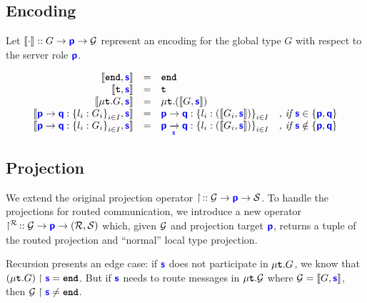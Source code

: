 \documentclass{article}
\begin{document}
\subsection{Encoding}
Let $\encode{\cdot} :: G \to \role{p} \to \newglobal$ represent an encoding for the global
type $G$ with respect to the server role $\role{p}$.

\doublespacing
\[
\begin{array}{rcll}
		\tyencode{\tyend}{s} & = & \tyend & \\
		\tyencode{\tyrecvar}{s} & = & \tyrecvar & \\
		\tyencode{\tyrec{G}}{s} & = & \tyrec{\left(\tyencode{G}{s}\right)} & \\
		\tyencode{\gcomm{p}{q}{l_i: G_i}{i \in I}}{s} & = & \gcomm{p}{q}{l_i: \left(\tyencode{G_i}{s}\right)}{i \in I} & \textit{, if $\role{s} \in \left\{\role{p}, \role{q}\right\}$} \\
		\tyencode{\gcomm{p}{q}{l_i: G_i}{i \in I}}{s} & = & \gcommroute{p}{q}{s}{l_i: \left(\tyencode{G_i}{s}\right)}{i \in I} & \textit{, if $\role{s} \notin \left\{\role{p}, \role{q}\right\}$} \\
\end{array}
\]
\singlespacing

\subsection{Projection}
We extend the original projection operator $\projop\,:: \newglobal \to \role{p} \to \newlocal$.
To handle the projections for routed communication,
we introduce a new operator $\projrouteop\,:: \newglobal \to \role{p} \to (\newroute, \newlocal)$
which, given $\newglobal$ and projection target $\role{p}$,
returns a tuple of the routed projection and ``normal'' local type projection.

Recursion presents an edge case: if $\role{s}$ does not participate in
$\tyrec{G}$, we know that $\proj{(\tyrec{G})}{s} = \tyend$.
But if $\role{s}$ needs to route messages in $\tyrec{\newglobal}$ 
where $\newglobal = \tyencode{G}{s}$, then $\proj{\newglobal}{s} \neq \tyend$.
\end{document}
